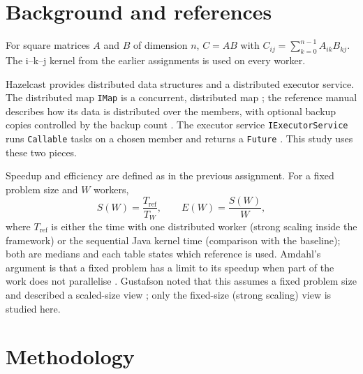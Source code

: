 \documentclass[11pt,a4paper]{article}
\begin{document}
\section{Background and references}
For square matrices $A$ and $B$ of dimension $n$, $C=AB$ with
$C_{ij}=\sum_{k=0}^{n-1}A_{ik}B_{kj}$. The i--k--j kernel from the earlier assignments is
used on every worker.

Hazelcast provides distributed data structures and a distributed executor service. The
distributed map \texttt{IMap} is a concurrent, distributed map \cite{hz-imap}; the reference
manual describes how its data is distributed over the members, with optional backup copies
controlled by the backup count \cite{hz-map-guide}. The executor service \texttt{IExecutorService} runs \texttt{Callable}
tasks on a chosen member and returns a \texttt{Future} \cite{hz-exec}. This study uses these
two pieces.

Speedup and efficiency are defined as in the previous assignment. For a fixed problem size
and $W$ workers,
\[
  S(W)=\frac{T_{\mathrm{ref}}}{T_W},\qquad E(W)=\frac{S(W)}{W},
\]
where $T_{\mathrm{ref}}$ is either the time with one distributed worker (strong scaling inside
the framework) or the sequential Java kernel time (comparison with the baseline); both are
medians and each table states which reference is used. Amdahl's argument is that a fixed
problem has a limit to its speedup when part of the work does not parallelise \cite{amdahl}.
Gustafson noted that this assumes a fixed problem size and described a scaled-size view
\cite{gustafson}; only the fixed-size (strong scaling) view is studied here.

\section{Methodology}
\end{document}
